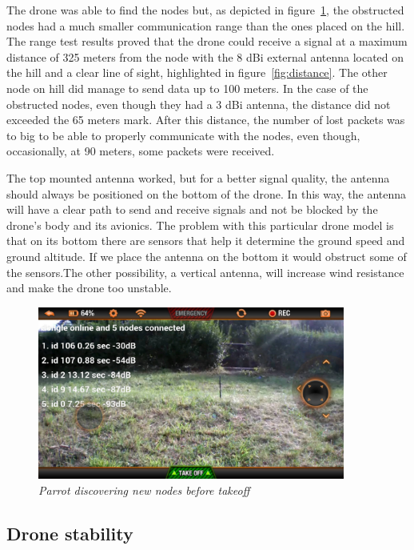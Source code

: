 The drone was able to find the nodes but, as depicted in figure~\ref{fig:discover}, the obstructed nodes had a much smaller communication range than the ones placed on the hill. The range test results proved that the drone could receive a signal at a maximum distance of 325 meters from the node with the 8 dBi external antenna located on the hill and a clear line of sight, highlighted in figure~\ref{fig:distance}. The other node on hill did manage to send data up to 100 meters. In the case of the obstructed nodes, even though they had a 3 dBi antenna, the distance did not exceeded the 65 meters mark. After this distance, the number of lost packets was to big to be able to properly communicate with the nodes, even though, occasionally, at 90 meters, some packets were received.


The top mounted antenna worked, but for a better signal quality, the antenna should always be positioned on the bottom of the drone. In this way, the antenna will have a clear path to send and receive signals and not be blocked by the drone's body and its avionics. The problem with this particular drone model is that on its bottom there are sensors that help it determine the ground speed and ground altitude. If we place the antenna on the bottom it would obstruct some of the sensors.The other possibility, a vertical antenna, will increase wind resistance and make the drone too unstable.


\begin{figure}[ht]
\begin{center}
\includegraphics[width=0.9\textwidth]{img/parrot_test.png}
\end{center}
\caption{\small \itshape{Parrot discovering new nodes before takeoff}}
  \label{fig:discover}
\end{figure}

\subsection{Drone stability}

